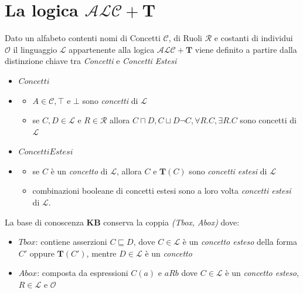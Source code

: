 \section{La logica $ \mathcal{ALC} + \mathbf{T} $}
Dato un alfabeto contenti nomi di Concetti $ \mathcal{C} $, di Ruoli $ \mathcal{R} $ e costanti di
individui $ \mathcal{O} $ il linguaggio $ \mathcal{L} $ appartenente alla logica $ \mathcal{ALC} + \mathbf{T} $
viene definito a partire dalla distinzione chiave tra \textit{Concetti} e \textit{Concetti Estesi} \cite{DLExtension}
\begin{multicols}{2}
	\begin{itemize}
		\item[] $ Concetti $
		\item[] \begin{itemize}
			\item[] $ A \in \mathcal{C}, \top \text{ e } \bot $ sono \textit{concetti} di $ \mathcal{L} $
			\item[] se $ C,D \in \mathcal{L} \text{ e } R \in \mathcal{R} $ allora
			 $ C \sqcap D,C \sqcup D \neg C, \forall R.C, \exists R.C $ sono concetti di $ \mathcal{L} $
		\end{itemize}
	\end{itemize}
	\begin{itemize}
		\item[] $ Concetti Estesi $
		\item[] \begin{itemize}
			\item[] se $ C $ è un \emph{concetto} di $ \mathcal{L} $, allora $ C $ e $\mathbf{T}(C)$ 
			sono \textit{concetti estesi} di $ \mathcal{L} $
			\item[] combinazioni booleane di concetti estesi sono a loro volta \textit{concetti estesi} di $ \mathcal{L} $.
		\end{itemize}
	\end{itemize}
\end{multicols}
La base di conoscenza \textbf{KB} conserva la coppia \textit{(Tbox, Abox)} dove:
\begin{itemize}
	\item $ Tbox $: contiene asserzioni $ C \sqsubseteq D \text{, dove } C \in \mathcal{L} $ è un 
	\textit{concetto esteso} della forma $ C'$ oppure $ \mathbf{T}(C') $, mentre $ D \in \mathcal{L} $ è un \textit{concetto}
	\item $ Abox $: composta da espressioni $ C(a) $ e $ aRb $ dove $ C \in \mathcal{L} $ è un 
	\textit{concetto esteso}, $ R \in \mathcal{L} $ e $ \mathcal{O} $
\end{itemize}
